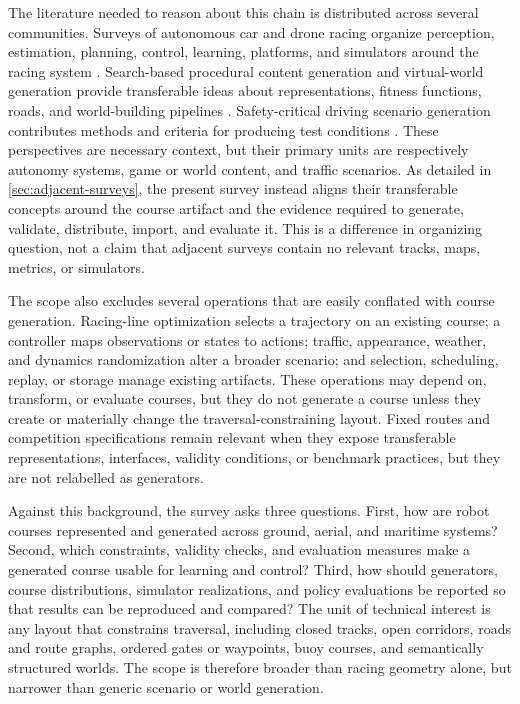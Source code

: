 The literature needed to reason about this chain is distributed across several
communities. Surveys of autonomous car and drone racing organize perception,
estimation, planning, control, learning, platforms, and simulators around the racing
system \cite{Betz2022AutonomousVehicles,Hanover2023AutonomousDrone}. Search-based
procedural content generation and virtual-world generation provide transferable ideas
about representations, fitness functions, roads, and world-building pipelines
\cite{Togelius2011SearchBased,Freiknecht2017SurveyVirtualWorlds}. Safety-critical
driving scenario generation contributes methods and criteria for producing test
conditions \cite{Ding2023SafetyCritical}. These perspectives are necessary context,
but their primary units are respectively autonomy systems, game or world content, and
traffic scenarios. As detailed in \cref{sec:adjacent-surveys}, the present survey
instead aligns their transferable concepts around the course artifact and the
evidence required to generate, validate, distribute, import, and evaluate it. This is
a difference in organizing question, not a claim that adjacent surveys contain no
relevant tracks, maps, metrics, or simulators.

The scope also excludes several operations that are easily conflated with course
generation. Racing-line optimization selects a trajectory on an existing course; a
controller maps observations or states to actions; traffic, appearance, weather, and
dynamics randomization alter a broader scenario; and selection, scheduling, replay,
or storage manage existing artifacts. These operations may depend on, transform, or
evaluate courses, but they do not generate a course unless they create or materially
change the traversal-constraining layout. Fixed routes and competition specifications
remain relevant when they expose transferable representations, interfaces, validity
conditions, or benchmark practices, but they are not relabelled as generators.

Against this background, the survey asks three questions. First, how are robot
courses represented and generated across ground, aerial, and maritime systems?
Second, which constraints, validity checks, and evaluation measures make a generated
course usable for learning and control? Third, how should generators, course
distributions, simulator realizations, and policy evaluations be reported so that
results can be reproduced and compared? The unit of technical interest is any layout
that constrains traversal, including closed tracks, open corridors, roads and route
graphs, ordered gates or waypoints, buoy courses, and semantically structured worlds.
The scope is therefore broader than racing geometry alone, but narrower than generic
scenario or world generation.

